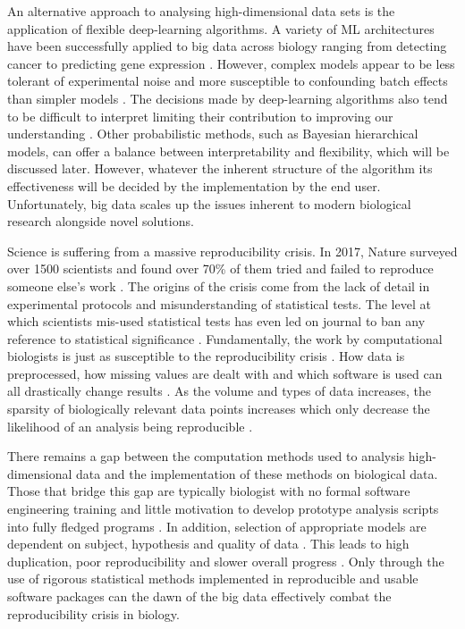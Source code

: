 \documentclass[../main.tex]{subfiles}
\begin{document}
An alternative approach to analysing high-dimensional data sets is the application of flexible deep-learning algorithms.
A variety of ML architectures have been successfully applied to big data across biology ranging from detecting cancer to predicting gene expression \parencite{Xie2017, Liang2015, Tang2019}.
However, complex models appear to be less tolerant of experimental noise and more susceptible to confounding batch effects than simpler models \parencite{Cortes2015, Kaiser2019, Schmitt2021}.
The decisions made by deep-learning algorithms also tend to be difficult to interpret limiting their contribution to improving our understanding \parencite{Caruana2015, Ribeiro2016}.
Other probabilistic methods, such as Bayesian hierarchical models, can offer a balance between interpretability and flexibility, which will be discussed later.
However, whatever the inherent structure of the algorithm its effectiveness will be decided by the implementation by the end user. 
Unfortunately, big data scales up the issues inherent to modern biological research alongside novel solutions. 

Science is suffering from a massive reproducibility crisis. 
In 2017, Nature surveyed over 1500 scientists and found over 70\% of them tried and failed to reproduce someone else's work \parencite{Baker2016}.
The origins of the crisis come from the lack of detail in experimental protocols and misunderstanding of statistical tests.
The level at which scientists mis-used statistical tests has even led on journal to ban any reference to statistical significance \parencite{Trafimow2015}.
Fundamentally, the work by computational biologists is just as susceptible to the reproducibility crisis \parencite{Garijo2013}.
How data is preprocessed, how missing values are dealt with and which software is used can all drastically change results \parencite{Ioannidis2009}.
As the volume and types of data increases, the sparsity of biologically relevant data points increases which only decrease the likelihood of an analysis being reproducible \parencite{Chattopadhyay2019}.

There remains a gap between the computation methods used to analysis high-dimensional data and the implementation of these methods on biological data.
Those that bridge this gap are typically biologist with no formal software engineering training \parencite{Attwood2019} and little motivation to develop prototype analysis scripts into fully fledged programs \parencite{Prins2015}. 
In addition, selection of appropriate models are dependent on subject, hypothesis and quality of data \parencite{Ching2018}.
This leads to high duplication, poor reproducibility and slower overall progress \parencite{Lawlor2015}.
Only through the use of rigorous statistical methods implemented in reproducible and usable software packages can the dawn of the big data effectively combat the reproducibility crisis in biology.
\end{document}
